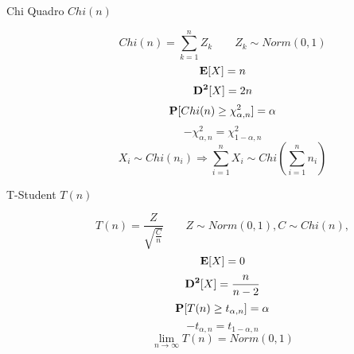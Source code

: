 \begin{description}
	\item[Chi Quadro $Chi(n)$]
		\begin{equation}
		Chi(n) = \sum_{k=1}^{n}Z_{k}
		\qquad
		Z_{k}\sim Norm(0,1)
		\end{equation}
		\begin{equation}
		\mathbf{E}[X]=n
		\end{equation}
		\begin{equation}
		\mathbf{D^{2}}[X]=2n
		\end{equation}
		\begin{equation}
		\mathbf{P}[Chi(n)\geq \chi^{2}_{\alpha,n}]=\alpha
		\end{equation}
		\begin{equation}
		-\chi^{2}_{\alpha,n}=\chi^{2}_{1-\alpha,n}
		\end{equation}
		\begin{equation}
		X_{i}\sim Chi(n_{i}) \Rightarrow \sum_{i=1}^{n}X_{i} \sim Chi(\sum_{i=1}^{n}n_{i})
		\end{equation}
		
	\item[T-Student $T(n)$]
		\begin{equation}
		T(n) = \frac{Z}{\sqrt{\frac{C}{n}}}
		\qquad
		Z\sim Norm(0,1),
		C\sim Chi(n),
		\end{equation}
		\begin{equation}
		\mathbf{E}[X]=0
		\end{equation}
		\begin{equation}
		\mathbf{D^{2}}[X]=\frac{n}{n-2}
		\end{equation}
		\begin{equation}
		\mathbf{P}[T(n)\geq t_{\alpha,n}]=\alpha
		\end{equation}
		\begin{equation}
		-t_{\alpha,n}=t_{1-\alpha,n}
		\end{equation}
		\begin{equation}
		\lim_{n\rightarrow\infty} T(n) = Norm(0,1)
		\end{equation}


\end{description}
